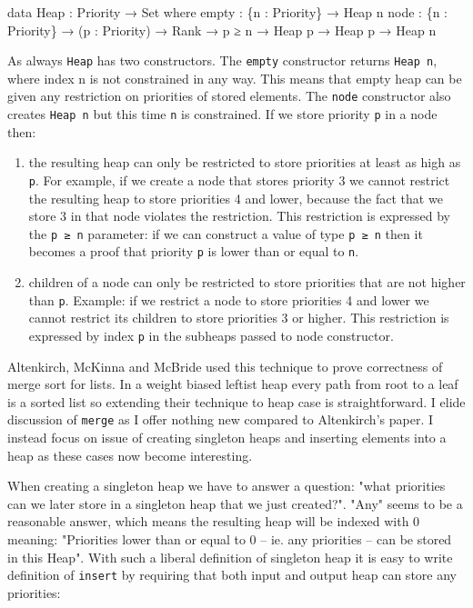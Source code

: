 \begin{code}
data Heap : Priority → Set where
  empty : \{n : Priority\} → Heap n
  node  : \{n : Priority\} → (p : Priority) → Rank → p ≥ n →
          Heap p → Heap p → Heap n
\end{code}
\noindent
As always \texttt{Heap} has two constructors. The \texttt{empty} constructor returns \texttt{Heap n}, where index n is not constrained in any way. This means that empty heap can be given any restriction on priorities of stored elements. The \texttt{node} constructor also creates \texttt{Heap n} but this time \texttt{n} is constrained. If we store priority \texttt{p} in a node then:

\begin{enumerate}
 \item the resulting heap can only be restricted to store priorities at least as high as \texttt{p}. For example, if we create a node that stores priority 3 we cannot restrict the resulting heap to store priorities 4 and lower, because the fact that we store 3 in that node violates the restriction. This restriction is expressed by the \texttt{p ≥ n} parameter: if we can construct a value of type \texttt{p ≥ n} then it becomes a proof that priority \texttt{p} is lower than or equal to \texttt{n}.
 \item children of a node can only be restricted to store priorities that are not higher than \texttt{p}. Example: if we restrict a node to store priorities 4 and lower we cannot restrict its children to store priorities 3 or higher. This restriction is expressed by index \texttt{p} in the subheaps passed to node constructor.
\end{enumerate}

Altenkirch, McKinna and McBride \cite{AltMcBMcK05} used this technique to prove correctness of merge sort for lists. In a weight biased leftist heap every path from root to a leaf is a sorted list so extending their technique to heap case is straightforward. I elide discussion of \texttt{merge} as I offer nothing new compared to Altenkirch's paper. I instead focus on issue of creating singleton heaps and inserting elements into a heap as these cases now become interesting.

When creating a singleton heap we have to answer a question: "what priorities can we later store in a singleton heap that we just created?". "Any" seems to be a reasonable answer, which means the resulting heap will be indexed with 0 meaning: "Priorities lower than or equal to 0 -- ie. any priorities -- can be stored in this Heap". With such a liberal definition of singleton heap it is easy to write definition of \texttt{insert} by requiring that both input and output heap can store any priorities:

